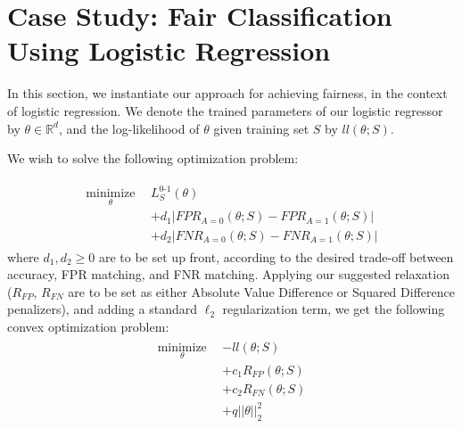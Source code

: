 \section{Case Study: Fair Classification Using Logistic Regression} \label{casestudy}
In this section, we instantiate our approach for achieving fairness, in the context of logistic regression. We denote the trained parameters of our logistic regressor by $\theta \in \mathbb{R}^d$, and the log-likelihood of $\theta$ given training set $S$ by $ll(\theta;S)$. 



We wish to solve the following optimization problem:


\begin{align}\label{eq:1}
\begin{split}
\underset{\theta}{\text{minimize}}
 ~~&L_{S}^{0\text{-}1}(\theta)\\
&+d_1|FPR_{A=0}(\theta;S)-FPR_{A=1}(\theta;S)|\\
&+d_2|FNR_{A=0}(\theta;S)-FNR_{A=1}(\theta;S)|
\end{split}
\end{align}
where $d_1, d_2 \geq 0$ are to be set up front, according to the desired trade-off between accuracy, FPR matching, and FNR matching. Applying our suggested relaxation ($R_{FP}$, $R_{FN}$ are to be set as either Absolute Value Difference or Squared Difference penalizers), and adding a standard $\ell_2$ regularization term, we get the following convex optimization problem:
\begin{align} \label{eq:2}
\begin{split}
\underset{\theta}{\text{minimize}}
~~&-ll(\theta;S) \\
&+c_1 R_{FP}(\theta;S) \\
&+c_2 R_{FN}(\theta;S)\\
&+q\left|\left|\theta\right|\right|_2^2 \\
\end{split}
\end{align}

